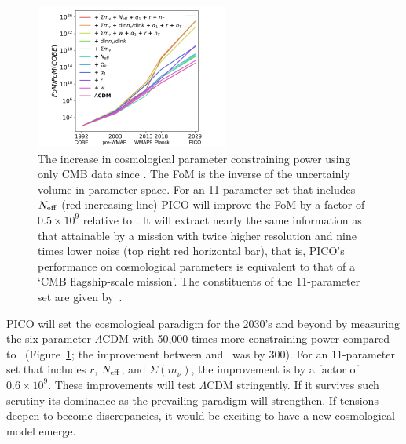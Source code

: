 \documentclass[PICOAPC.tex]{subfiles}
\begin{document}
\begin{figure}[h]
\hspace{-0.2in}
\parbox{2.6in}{\centerline {
\includegraphics[width=2.5in]{images/fom_plot_CVL+del.pdf} } }
\hspace{-0.17in}
\parbox{4.1in}{
\caption{\captiontext 
The increase in cosmological parameter constraining power using only CMB data since \cobe . The FoM is the inverse of the uncertainly volume in parameter space. 
For an 11-parameter set that includes ${N_{\rm eff}}$ (red increasing line) PICO will improve the FoM by a factor of $0.5\times10^{9}$ relative to \planck . It will extract nearly the same information as that attainable by a mission with twice higher resolution and nine times lower noise (top right red horizontal bar), that is, PICO's performance on cosmological parameters is equivalent to that of a `CMB flagship-scale mission'. The constituents of the 11-parameter set are given by~\citet{pico_report}. 
\label{fig:fom} } }
\vspace{-0.1in}
\end{figure}

PICO will set the cosmological paradigm for the 2030's and beyond by measuring the six-parameter $\Lambda$CDM with 50,000 times more constraining power compared to \planck\ (Figure~\ref{fig:fom}; the improvement between \wmap and \planck\ was by 300). For an 11-parameter set that includes $r$, ${N_{\rm eff}}$, and $\Sigma (m_{\nu})$, the improvement is by a factor of $0.6\times10^{9}$. These improvements will test $\Lambda$CDM stringently. If it survives such scrutiny its dominance as the prevailing paradigm will strengthen. If tensions deepen to become discrepancies, it would be exciting to have a new cosmological model emerge. 
\end{document}

